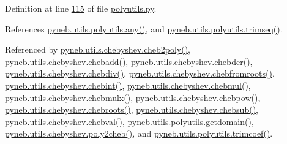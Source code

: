 Definition at line \hyperlink{polyutils_8py_source_l00115}{115} of file \hyperlink{polyutils_8py_source}{polyutils.\-py}.



References \hyperlink{polyutils_8py_source_l00076}{pyneb.\-utils.\-polyutils.\-any()}, and \hyperlink{polyutils_8py_source_l00085}{pyneb.\-utils.\-polyutils.\-trimseq()}.



Referenced by \hyperlink{chebyshev_8py_source_l00359}{pyneb.\-utils.\-chebyshev.\-cheb2poly()}, \hyperlink{chebyshev_8py_source_l00534}{pyneb.\-utils.\-chebyshev.\-chebadd()}, \hyperlink{chebyshev_8py_source_l00841}{pyneb.\-utils.\-chebyshev.\-chebder()}, \hyperlink{chebyshev_8py_source_l00725}{pyneb.\-utils.\-chebyshev.\-chebdiv()}, \hyperlink{chebyshev_8py_source_l00472}{pyneb.\-utils.\-chebyshev.\-chebfromroots()}, \hyperlink{chebyshev_8py_source_l00912}{pyneb.\-utils.\-chebyshev.\-chebint()}, \hyperlink{chebyshev_8py_source_l00676}{pyneb.\-utils.\-chebyshev.\-chebmul()}, \hyperlink{chebyshev_8py_source_l00637}{pyneb.\-utils.\-chebyshev.\-chebmulx()}, \hyperlink{chebyshev_8py_source_l00790}{pyneb.\-utils.\-chebyshev.\-chebpow()}, \hyperlink{chebyshev_8py_source_l01276}{pyneb.\-utils.\-chebyshev.\-chebroots()}, \hyperlink{chebyshev_8py_source_l00584}{pyneb.\-utils.\-chebyshev.\-chebsub()}, \hyperlink{chebyshev_8py_source_l01018}{pyneb.\-utils.\-chebyshev.\-chebval()}, \hyperlink{polyutils_8py_source_l00236}{pyneb.\-utils.\-polyutils.\-getdomain()}, \hyperlink{chebyshev_8py_source_l00309}{pyneb.\-utils.\-chebyshev.\-poly2cheb()}, and \hyperlink{polyutils_8py_source_l00182}{pyneb.\-utils.\-polyutils.\-trimcoef()}.



